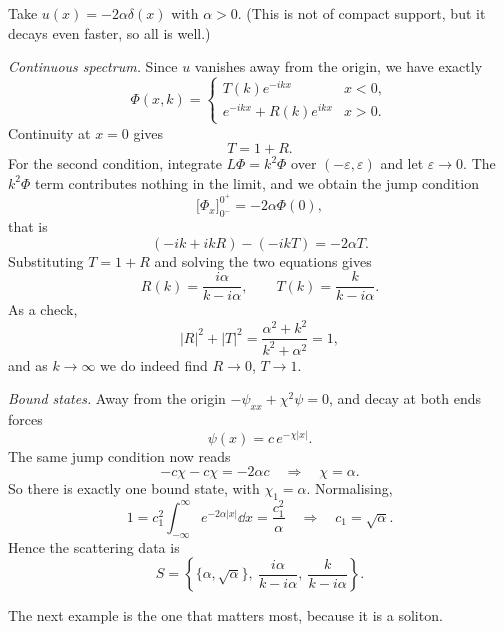 \documentclass[a4paper]{scrartcl}
\begin{document}
\begin{example}
	Take $u(x) = -2\alpha\delta(x)$ with $\alpha>0$. (This is not of compact support, but it decays even faster, so all is well.)

	\emph{Continuous spectrum.} Since $u$ vanishes away from the origin, we have exactly
	$$
	\Phi(x,k) = \begin{cases}T(k)e^{-ikx} & x<0,\\ e^{-ikx} + R(k)e^{ikx} & x>0.\end{cases}
	$$
	Continuity at $x=0$ gives
	$$
	T = 1 + R.
	$$
	For the second condition, integrate $L\Phi = k^2\Phi$ over $(-\varepsilon,\varepsilon)$ and let $\varepsilon\to0$. The $k^2\Phi$ term contributes nothing in the limit, and we obtain the jump condition
	$$
	\Big[\Phi_x\Big]_{0^-}^{0^+} = -2\alpha\Phi(0),
	$$
	that is
	$$
	\left(-ik + ikR\right) - \left(-ikT\right) = -2\alpha T.
	$$
	Substituting $T = 1+R$ and solving the two equations gives
	$$
	R(k) = \frac{i\alpha}{k - i\alpha}, \qquad T(k) = \frac{k}{k-i\alpha}.
	$$
	As a check,
	$$
	|R|^2 + |T|^2 = \frac{\alpha^2 + k^2}{k^2+\alpha^2} = 1,
	$$
	and as $k\to\infty$ we do indeed find $R\to0$, $T\to1$.

	\emph{Bound states.} Away from the origin $-\psi_{xx} + \chi^2\psi = 0$, and decay at both ends forces
	$$
	\psi(x) = c\,e^{-\chi|x|}.
	$$
	The same jump condition now reads
	$$
	-c\chi - c\chi = -2\alpha c \quad\Longrightarrow\quad \chi = \alpha.
	$$
	So there is exactly one bound state, with $\chi_1 = \alpha$. Normalising,
	$$
	1 = c_1^2\int_{-\infty}^\infty e^{-2\alpha|x|}\dd x = \frac{c_1^2}{\alpha} \quad\Longrightarrow\quad c_1 = \sqrt\alpha.
	$$
	Hence the scattering data is
	$$
	S = \left\{\{\alpha, \sqrt\alpha\},\ \frac{i\alpha}{k-i\alpha},\ \frac{k}{k-i\alpha}\right\}.
	$$
\end{example}

The next example is the one that matters most, because it is a soliton.
\end{document}
